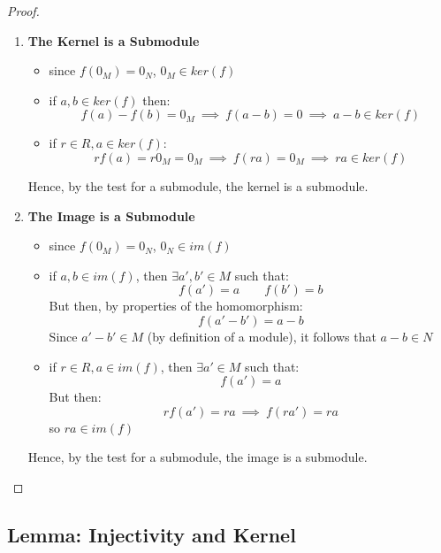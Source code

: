 \documentclass{exam}
\begin{document}
\begin{proof}

\begin{enumerate}
    \item \textbf{The Kernel is a Submodule}
    \begin{itemize}
        \item since $f(0_M) = 0_N$, $0_M \in ker(f)$ 
        \item if $a,b \in ker(f)$ then:
        \[
        f(a) - f(b) = 0_M \ \implies \ f(a - b) = 0 \ \implies \ a-b \in ker(f)
        \]
        \item if $r \in R, a \in ker(f)$:
        \[
        rf(a) = r0_M = 0_M \ \implies \ f(ra) = 0_M \ \implies \ ra \in ker(f)
        \]
    \end{itemize}
    Hence, by the test for a submodule, the kernel is a submodule.
    \item \textbf{The Image is a Submodule}
    \begin{itemize}
        \item since $f(0_M) = 0_N$, $0_N \in im(f)$ 
        \item if $a,b \in im(f)$, then $\exists a',b' \in M$ such that:
        \[
        f(a') = a \qquad f(b') = b
        \]
        But then, by properties of the homomorphism:
        \[
        f(a' - b') = a-b
        \]
        Since $a'-b' \in M$ (by definition of a module), it follows that $a - b \in N$
        \item if $r \in R, a \in im(f)$, then $\exists a' \in M$ such that:
        \[
        f(a') = a
        \]
        But then:
        \[
        rf(a') = ra \ \implies \ f(ra') = ra
        \]
        so $ra \in im(f)$
    \end{itemize}
    Hence, by the test for a submodule, the image is a submodule.
\end{enumerate}

\end{proof}



\subsection{Lemma: Injectivity and Kernel}

\end{document}
